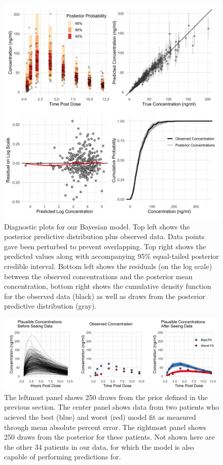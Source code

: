 \begin{figure}
	\centering
	\includegraphics[width=0.9\linewidth]{figs/diagnostics}
	\caption{Diagnostic plots for our Bayesian model.  Top left shows the posterior predictive distribution plus observed data.  Data points gave been perturbed to prevent overlapping. Top right shows the predicted values along with accompanying 95\% equal-tailed posterior credible interval. Bottom left shows the residuals (on the log scale) between the observed concentrations and the posterior mean concentration, bottom right shows the cumulative density function for the observed data (black) as well as draws from the posterior predictive distribution (gray).}
	\label{fig:fig3}
\end{figure}


\begin{figure}
	\centering
	\includegraphics[width=\linewidth]{figs/fig3}
	\caption{The leftmost panel shows 250 draws from the prior defined in the previous section.  The center panel shows data from two patients who acieved the best (blue) and worst (red) model fit as measured through mean absolute percent error.  The rightmost panel shows 250 draws from the posterior for these patients.  Not shown here are the other 34 patients in our data, for which the model is also capable of performing predictions for. }
	\label{fig:fig4}
\end{figure}


